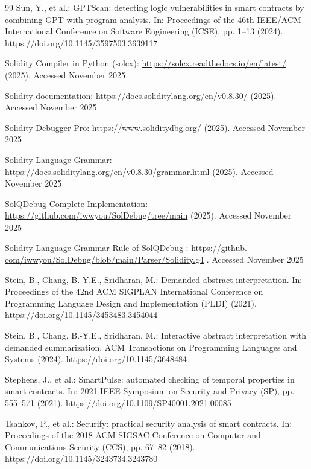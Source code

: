 \documentclass[pdflatex,sn-basic]{sn-jnl}%
\theoremstyle{thmstyleone}%
\theoremstyle{thmstyletwo}%
\theoremstyle{thmstylethree}%
\begin{document}
\begin{thebibliography}{99}
Sun, Y., et al.: GPTScan: detecting logic vulnerabilities in smart contracts by combining GPT with program analysis. In: Proceedings of the 46th IEEE/ACM International Conference on Software Engineering (ICSE), pp. 1--13 (2024). https://doi.org/10.1145/3597503.3639117

Solidity Compiler in Python (solcx): \url{https://solcx.readthedocs.io/en/latest/} (2025). Accessed
November 2025

Solidity documentation: \url{https://docs.soliditylang.org/en/v0.8.30/} (2025). Accessed November
2025

Solidity Debugger Pro: \url{https://www.soliditydbg.org/} (2025). Accessed November 2025

Solidity Language Grammar: \url{https://docs.soliditylang.org/en/v0.8.30/grammar.html} (2025). Accessed November 2025

SolQDebug Complete Implementation: \url{https://github.com/iwwyou/SolDebug/tree/main} (2025). Accessed November 2025

Solidity Language Grammar Rule of SolQDebug : \url{https://github.
com/iwwyou/SolDebug/blob/main/Parser/Solidity.g4} . Accessed November 2025

Stein, B., Chang, B.-Y.E., Sridharan, M.: Demanded abstract interpretation. In: Proceedings of the
42nd ACM SIGPLAN International Conference on Programming Language Design and Implementation (PLDI)
(2021). https://doi.org/10.1145/3453483.3454044

Stein, B., Chang, B.-Y.E., Sridharan, M.: Interactive abstract interpretation with demanded
summarization. ACM Transactions on Programming Languages and Systems (2024). https://doi.org/10.1145/3648484

Stephens, J., et al.: SmartPulse: automated checking of temporal properties in smart contracts. In:
2021 IEEE Symposium on Security and Privacy (SP), pp. 555--571 (2021). https://doi.org/10.1109/SP40001.2021.00085

Tsankov, P., et al.: Securify: practical security analysis of smart contracts. In: Proceedings of
the 2018 ACM SIGSAC Conference on Computer and Communications Security (CCS), pp. 67--82 (2018). https://doi.org/10.1145/3243734.3243780


\end{thebibliography}
\end{document}
